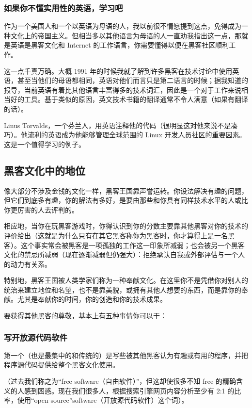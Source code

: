 \subsubsection{如果你不懂实用性的英语，学习吧}
作为一个美国人和一个以英语为母语的人，我以前很不情愿提到这点，免得成为一种文化上的帝国主义。但相当多以其他语言为母语的人一直劝我指出这一点，那就是英语是黑客文化和 Internet 的工作语言，你需要懂得以便在黑客社区顺利工作。

这一点千真万确。大概 1991 年的时候我就了解到许多黑客在技术讨论中使用英语，甚至当他们的母语都相同，英语对他们而言只是第二语言的时候；据我知道的报导，当前英语有着比其他语言丰富得多的技术词汇，因此是一个对于工作来说相当好的工具。基于类似的原因，英文技术书籍的翻译通常不令人满意（如果有翻译的话）。

Linus Torvalds，一个芬兰人，用英语注释他的代码（很明显这对他来说不是凑巧）。他流利的英语成为他能够管理全球范围的 Linux 开发人员社区的重要因素。这是一个值得学习的例子。


\subsection{黑客文化中的地位}
像大部分不涉及金钱的文化一样，黑客王国靠声誉运转。你设法解决有趣的问题，但它们到底多有趣，你的解法有多好，是要由那些和你具有同样技术水平的人或比你更厉害的人去评判的。

相应地，当你在玩黑客游戏时，你得认识到你的分数主要靠其他黑客对你的技术的评价给出（这就是为什么只有在其它黑客称你为黑客时，你才算得上是一名黑客）。这个事实常会被黑客是一项孤独的工作这一印象所减弱；也会被另一个黑客文化的禁忌所减弱（现在逐渐减弱但仍强大）：拒绝承认自我或外部评估与一个人的动力有关系。

特别地，黑客王国被人类学家们称为一种奉献文化。在这里你不是凭借你对别人的统治来建立地位和名望，也不是靠美貌，或拥有其他人想要的东西，而是靠你的奉献。尤其是奉献你的时间，你的创造和你的技术成果。

要获得其他黑客的尊敬，基本上有五种事情你可以干：


\subsubsection{写开放源代码软件}
第一个（也是最集中的和传统的）是写些被其他黑客认为有趣或有用的程序，并把程序源代码提供给整个黑客文化使用。

（过去我们称之为“free software（自由软件）”，但这却使很多不知 free 的精确含义的人感到困惑。现在我们很多人，根据搜索引擎网页内容分析至少有 2:1 的比率，使用“open-source”software（开放源代码软件）这个词）。

